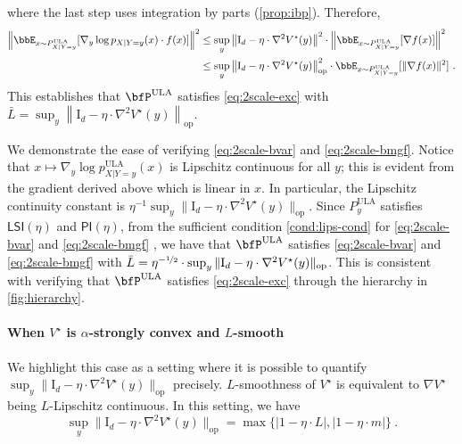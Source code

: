\documentclass[11pt]{article}
\newcommand{\rmI}{\mathrm{I}}
\newcommand{\op}{\mathrm{op}}
\newcommand{\PI}[1]{\mathsf{PI}\left(#1\right)}
\newcommand{\LSI}[1]{\mathsf{LSI}\left(#1\right)}
\begin{document}
where the last step uses integration by parts (\cref{prop:ibp}).
Therefore,
\begin{align*}
    \left\|\bbE_{x \sim P_{X | Y = y}^{\text{ULA}}}[\nabla_{y}\log p_{X | Y = y}(x) \cdot f(x)]\right\|^{2} &\leq \sup_{y} \left\|\rmI_{d} - \eta \cdot \nabla^{2}V^{\star}(y)\right\|^{2} \cdot \left\|\bbE_{x \sim P_{X | Y = y}^{\text{ULA}}}[\nabla f(x)]\right\|^{2} \\
    &\leq \sup_{y} \left\|\rmI_{d} - \eta \cdot \nabla^{2}V^{\star}(y)\right\|_{\op}^{2} \cdot \bbE_{x \sim P_{X | Y = y}^{\text{ULA}}}[\|\nabla f(x)\|^{2}]~.
\end{align*}
This establishes that \(\bfP^{\text{ULA}}\) satisfies \ref{eq:2scale-exc} with \(\bar{L} = \sup_{y} \left\|\rmI_{d} - \eta \cdot \nabla^{2}V^{\star}(y)\right\|_{\op}\).

We demonstrate the ease of verifying \ref{eq:2scale-bvar} and \ref{eq:2scale-bmgf}.
Notice that \(x\mapsto \nabla_{y}\log p_{X | Y = y}^{\text{ULA}}(x)\) is Lipschitz continuous for all \(y\); this is evident from the gradient derived above which is linear in \(x\).
In particular, the Lipschitz continuity constant is \(\eta^{-1} \sup_{y} \|\rmI_{d} - \eta \cdot \nabla^{2}V^{\star}(y)\|_{\op}\).
Since \(P_{y}^{\text{ULA}}\) satisfies \(\LSI{\eta}\) and \(\PI{\eta}\), from the sufficient condition \ref{cond:lips-cond} for \ref{eq:2scale-bvar} and \ref{eq:2scale-bmgf} , we have that \(\bfP^{\text{ULA}}\) satisfies \ref{eq:2scale-bvar} and \ref{eq:2scale-bmgf} with \(\bar{L} = \eta^{-\nicefrac{1}{2}} \cdot \sup_{y} \|\rmI_{d} - \eta \cdot \nabla^{2}V^{\star}(y)\|_{\op}\).
This is consistent with verifying that \(\bfP^{\text{ULA}}\) satisfies \ref{eq:2scale-exc} through the hierarchy in \cref{fig:hierarchy}.

\paragraph{When \(V^{\star}\) is \(\alpha\)-strongly convex and \(L\)-smooth}

We highlight this case as a setting where it is possible to quantify \(\sup_{y} \|\rmI_{d} - \eta \cdot \nabla^{2} V^{\star}(y)\|_{\op}\) precisely.
\(L\)-smoothness of \(V^{\star}\) is equivalent to \(\nabla V^{\star}\) being \(L\)-Lipschitz continuous.
In this setting, we have
\begin{equation*}
    \sup_{y} \|\rmI_{d} - \eta \cdot \nabla^{2}V^{\star}(y)\|_{\op} = \max\{|1 - \eta \cdot L|, |1 - \eta \cdot m|\}~.
\end{equation*}
\end{document}
